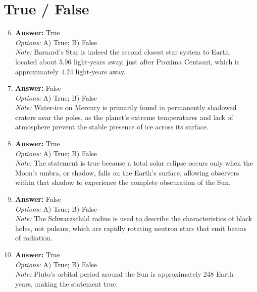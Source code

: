\documentclass[12pt]{article}
\begin{document}
\section*{True / False}
\begin{enumerate}[label=\arabic*.]
\setcounter{enumi}{5}
\item \textbf{Answer:} True
\\ \textit{Options:} A) True; B) False
\\ \textit{Note:} Barnard's Star is indeed the second closest star system to Earth, located about 5.96 light-years away, just after Proxima Centauri, which is approximately 4.24 light-years away.
\item \textbf{Answer:} False
\\ \textit{Options:} A) True; B) False
\\ \textit{Note:} Water-ice on Mercury is primarily found in permanently shadowed craters near the poles, as the planet's extreme temperatures and lack of atmosphere prevent the stable presence of ice across its surface.
\item \textbf{Answer:} True
\\ \textit{Options:} A) True; B) False
\\ \textit{Note:} The statement is true because a total solar eclipse occurs only when the Moon's umbra, or shadow, falls on the Earth's surface, allowing observers within that shadow to experience the complete obscuration of the Sun.
\item \textbf{Answer:} False
\\ \textit{Options:} A) True; B) False
\\ \textit{Note:} The Schwarzschild radius is used to describe the characteristics of black holes, not pulsars, which are rapidly rotating neutron stars that emit beams of radiation.
\item \textbf{Answer:} True
\\ \textit{Options:} A) True; B) False
\\ \textit{Note:} Pluto's orbital period around the Sun is approximately 248 Earth years, making the statement true.
\end{enumerate}
\end{document}
